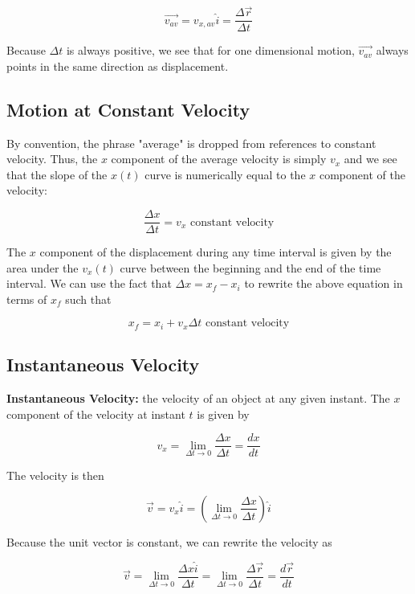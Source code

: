         \[
            \overrightarrow{v_{av}} = v_{x,av}\hat{i} = \frac{\Delta \overrightarrow{r}}{\Delta t}
        \]

        \noindent Because $\Delta t$ is always positive, we see that for one dimensional motion, $\overrightarrow{v_{av}}$ always points in the same direction as displacement.



    \subsection{Motion at Constant Velocity}
        By convention, the phrase "average" is dropped from references to constant velocity. Thus, the $x$ component of the average velocity is simply $v_x$ and we see that the slope of the $x(t)$ curve is numerically
        equal to the $x$ component of the velocity:

        \[
            \frac{\Delta x}{\Delta t} = v_x \text{ constant velocity}
        \]

        \noindent The $x$ component of the displacement during any time interval is given by the area under the $v_x (t)$ curve between the beginning and the end of the time interval. We can use the fact that
        $\Delta x = x_f - x_i$ to rewrite the above equation in terms of $x_f$ such that

        \[
            x_f = x_i + v_x \Delta t \text{ constant velocity}
        \]



    \subsection{Instantaneous Velocity}
        \textbf{Instantaneous Velocity:} the velocity of an object at any given instant. The $x$ component of the velocity at instant $t$ is given by

        \[
            v_x = \lim_{\Delta t\to 0} \frac{\Delta x}{\Delta t} = \frac{dx}{dt}
        \]

        The velocity is then

        \[
            \overrightarrow{v} = v_x \hat{i} = \left(\lim_{\Delta t\to 0} \frac{\Delta x}{\Delta t}\right) \hat{i}
        \]

        Because the unit vector is constant, we can rewrite the velocity as

        \[
            \overrightarrow{v} = \lim_{\Delta t\to 0} \frac{\Delta x \hat{i}}{\Delta t} = \lim_{\Delta t\to 0}\frac{\Delta \overrightarrow{r}}{\Delta t} = \frac{d\overrightarrow{r}}{dt}
        \]

